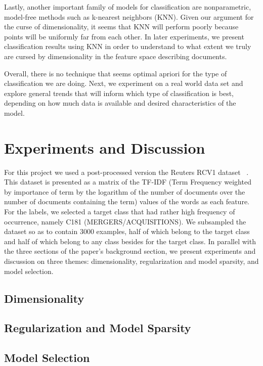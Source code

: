 \documentclass[]{article}
\begin{document}
	Lastly, another important family of models for classification are nonparametric, model-free methods such as k-nearest neighbors (KNN). Given our argument for the curse of dimensionality, it seems that KNN will perform poorly because points will be uniformly far from each other. In later experiments, we present classification results using KNN in order to understand to what extent we truly are cursed by dimensionality in the feature space describing documents. 

Overall, there is no technique that seems optimal apriori for the type of classification we are doing. Next, we experiment on a real world data set and explore general trends that will inform which type of classification is best, depending on how much data is available and desired characteristics of the model. 

\section{Experiments and Discussion}

For this project we used a post-processed version the Reuters RCV1 dataset ~\cite{lewis2004rcv1}. This dataset is presented as a matrix of the TF-IDF (Term Frequency weighted by importance of term by the logarithm of the number of documents over the number of documents containing the term) values of the words as each feature. For the labels, we selected a target class that had rather high frequency of occurrence, namely C181 (MERGERS/ACQUISITIONS). We subsampled the dataset so as to contain 3000 examples, half of which belong to the target class and half of which belong to any class besides for the target class.
In parallel with the three sections of the paper's background section, we  present experiments and discussion on three themes: dimensionality, regularization and model sparsity, and model selection. 

\subsection{Dimensionality}


\subsection{Regularization and Model Sparsity}


\subsection{Model Selection}


\pagebreak


\end{document}
